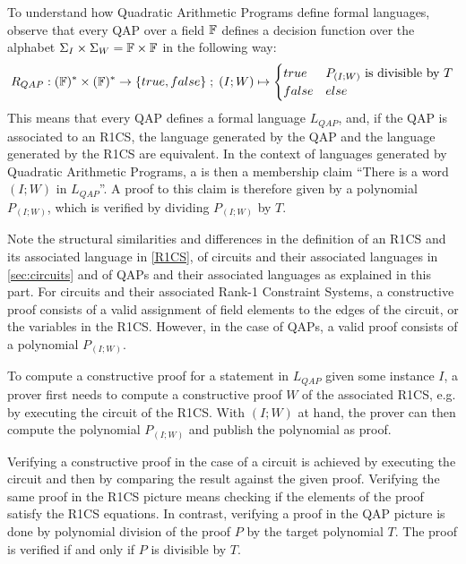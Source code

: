 To understand how Quadratic Arithmetic Programs define formal languages, observe that every QAP over a field $\mathbb{F}$ defines a decision function over the alphabet $\Sigma_I \times \Sigma_W = \mathbb{F} \times \mathbb{F}$ in the following way:
\begin{equation}
R_{QAP} : (\mathbb{F})^* \times (\mathbb{F})^* \to \{true, false\}\;;\;
(I;W) \mapsto
\begin{cases}
true & P_{(I;W)} \text{ is divisible by } T\\
false & else
\end{cases}
\end{equation}
This means that every QAP defines a formal language $L_{QAP}$, and, if the QAP is associated to an R1CS, the language generated by the QAP and the language generated by the R1CS are equivalent. In the context of languages generated by Quadratic Arithmetic Programs, a  is then a membership claim ``There is a word $(I;W)$ in $L_{QAP}$''. A proof to this claim is therefore given by a polynomial $P_{(I;W)}$, which is verified by dividing $P_{(I;W)}$ by $T$.

Note the structural similarities and differences in the definition of an R1CS and its associated language in \ref{R1CS}, of circuits and their associated languages in \ref{sec:circuits} and of QAPs and their associated languages as explained in this part. For circuits and their associated Rank-1 Constraint Systems, a constructive proof consists of a valid assignment of field elements to the edges of the circuit, or the variables in the R1CS. However, in the case of QAPs, a valid proof consists of a polynomial $P_{(I;W)}$.

To compute a constructive proof for a statement in $L_{QAP}$ given some instance $I$, a prover first needs to compute a constructive proof $W$ of the associated R1CS, e.g. by executing the circuit of the R1CS. With $(I;W)$ at hand, the prover can then compute the polynomial $P_{(I;W)}$ and publish the polynomial as proof.

Verifying a constructive proof in the case of a circuit is achieved by executing the circuit and then by comparing the result against the given proof. Verifying the same proof in the R1CS picture means checking if the elements of the proof satisfy the R1CS equations. In contrast, verifying a proof in the QAP picture is done by polynomial division of the proof $P$ by the target polynomial $T$. The proof is verified if and only if $P$ is divisible by $T$.

